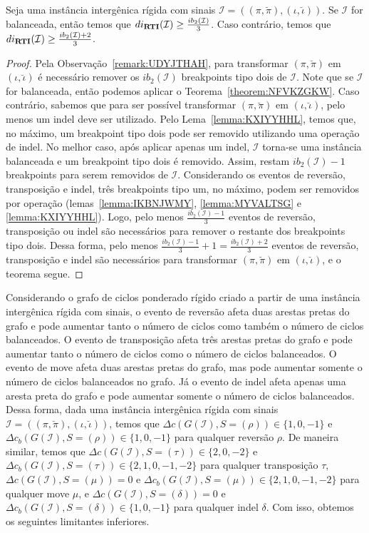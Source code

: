 \begin{theorem}\label{theorem:JGVDYLDM}
Seja uma instância intergênica rígida com sinais $\mathcal{I} = ((\pi,\breve\pi),(\iota,\breve\iota))$. Se $\mathcal{I}$ for balanceada, então temos que $di_{\textbf{RTI}}(\mathcal{I}) \ge \frac{ib_2(\mathcal{I})}{3}$. Caso contrário, temos que $di_{\textbf{RTI}}(\mathcal{I}) \ge \frac{ib_2(\mathcal{I}) + 2}{3}$.
\end{theorem}
\begin{proof}
Pela Observação~\ref{remark:UDYJTHAH}, para transformar $(\pi,\breve\pi)$ em $(\iota,\breve\iota)$ é necessário remover os $ib_2(\mathcal{I})$ breakpoints tipo dois de $\mathcal{I}$. Note que se $\mathcal{I}$ for balanceada, então podemos aplicar o Teorema~\ref{theorem:NFVKZGKW}. Caso contrário, sabemos que para ser possível transformar $(\pi,\breve\pi)$ em $(\iota,\breve\iota)$, pelo menos um indel deve ser utilizado. Pelo Lema~\ref{lemma:KXIYYHHL}, temos que, no máximo, um breakpoint tipo dois pode ser removido utilizando uma operação de indel. No melhor caso, após aplicar apenas um indel, $\mathcal{I}$  torna-se uma instância balanceada e um breakpoint tipo dois é removido. Assim, restam $ib_2(\mathcal{I}) - 1$ breakpoints para serem removidos de $\mathcal{I}$. Considerando os eventos de reversão, transposição e indel, três breakpoints tipo um, no máximo, podem ser removidos por operação (lemas~\ref{lemma:IKBNJWMY}, \ref{lemma:MYVALTSG} e \ref{lemma:KXIYYHHL}). Logo, pelo menos $\frac{ib_2(\mathcal{I}) - 1}{3}$ eventos de reversão, transposição ou indel são necessários para remover o restante dos breakpoints tipo dois. Dessa forma, pelo menos $\frac{ib_2(\mathcal{I}) - 1}{3} + 1 = \frac{ib_2(\mathcal{I}) + 2}{3}$ eventos de reversão, transposição e indel são necessários para transformar $(\pi,\breve\pi)$ em $(\iota,\breve\iota)$, e o teorema segue.
\end{proof}

Considerando o grafo de ciclos ponderado rígido criado a partir de uma instância intergênica rígida com sinais, o evento de reversão afeta duas arestas pretas do grafo e pode aumentar tanto o número de ciclos como também o número de ciclos balanceados. O evento de transposição afeta três arestas pretas do grafo e pode aumentar tanto o número de ciclos como o número de ciclos balanceados. O evento de move afeta duas arestas pretas do grafo, mas pode aumentar somente o número de ciclos balanceados no grafo. Já o evento de indel afeta apenas uma aresta preta do grafo e pode aumentar somente o número de ciclos balanceados. Dessa forma, dada uma instância intergênica rígida com sinais $\mathcal{I} = ((\pi,\breve\pi),(\iota,\breve\iota))$, temos que $\Delta c(G(\mathcal{I}), S=(\rho)) \in \{1,0,-1\}$ e $\Delta c_b(G(\mathcal{I}), S=(\rho)) \in \{1,0,-1\}$ para qualquer reversão $\rho$. De maneira similar, temos que $\Delta c(G(\mathcal{I}), S=(\tau)) \in \{2,0,-2\}$ e $\Delta c_b(G(\mathcal{I}), S=(\tau)) \in \{2,1,0,{-1},{-2}\}$ para qualquer transposição $\tau$, $\Delta c(G(\mathcal{I}), S=(\mu)) = 0$ e $\Delta c_b(G(\mathcal{I}), S=(\mu)) \in \{2,1,0,{-1},{-2}\}$ para qualquer move $\mu$, e $\Delta c(G(\mathcal{I}), S=(\delta)) = 0$ e $\Delta c_b(G(\mathcal{I}), S=(\delta)) \in \{1,0,{-1}\}$ para qualquer indel $\delta$. Com isso, obtemos os seguintes limitantes inferiores.

